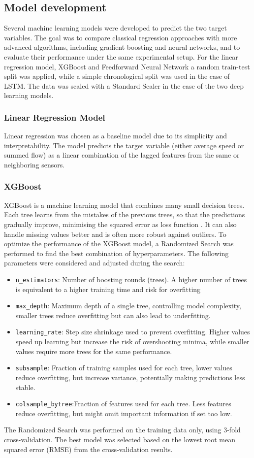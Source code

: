 	\subsection{Model development}
	Several machine learning models were developed to predict the two target variables. The goal was to compare classical regression approaches with more advanced algorithms, including gradient boosting and neural networks, and to evaluate their performance under the same experimental setup.
	For the linear regression model, XGBoost and Feedforward Neural Network a random train-test split was applied, while a simple chronological split was used in the case of LSTM. The data was scaled with a Standard Scaler in the case of the two deep learning models.
	\subsubsection{Linear Regression Model}
	Linear regression was chosen as a baseline model due to its simplicity and interpretability. The model predicts the target variable (either average speed or summed flow) as a linear combination of the lagged features from the same or neighboring sensors.
	\subsubsection{XGBoost}
	XGBoost is a machine learning model that combines many small decision trees. Each tree learns from the mistakes of the previous trees, so that the predictions gradually improve, minimising the squared error as loss function \cite{xgboost_loss}.  It can also handle missing values better and is often more robust against outliers.
	To optimize the performance of the XGBoost model, a Randomized Search \cite{randomsearch} was performed to find the best combination of hyperparameters. The following parameters \cite{xgboostparameters} were considered and adjusted during the search:
	\begin{itemize}
		\item \texttt{n\_estimators}: Number of boosting rounds (trees). A higher number of trees is equivalent to a higher training time and risk for overfitting
		\item \texttt{max\_depth}: Maximum depth of a single tree, controlling model complexity, smaller trees reduce overfitting but can also lead to underfitting.
		\item \texttt{learning\_rate}: Step size shrinkage used to prevent overfitting. Higher values speed up learning but increase the risk of overshooting minima, while smaller values require more trees for the same performance.
		\item \texttt{subsample}: Fraction of training samples used for each tree, lower values reduce overfitting, but increase variance, potentially making predictions less stable.
		\item  \texttt{colsample\_bytree}:Fraction of features used for each tree. Less features reduce overfitting, but might omit important information if set too low.	
	\end{itemize}
	The Randomized Search was performed on the training data only, using 3-fold cross-validation.
	The best model was selected based on the lowest root mean squared error (RMSE) from the cross-validation results.

